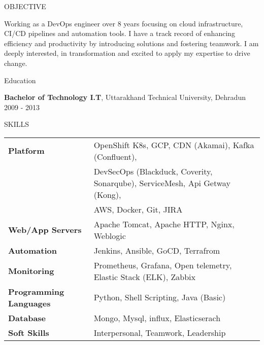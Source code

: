 \documentclass{resume} %
\begin{document}

\begin{rSection}{OBJECTIVE}

{Working as a DevOps engineer over 8 years focusing on cloud infrastructure, CI/CD pipelines and automation tools. I have a track record of enhancing efficiency and productivity by introducing solutions and fostering teamwork. I am deeply interested, in transformation and excited to apply my expertise to drive change.}


\end{rSection}

\begin{rSection}{Education}


{\bf Bachelor of Technology I.T}, Uttarakhand Technical University, Dehradun \hfill {2009 - 2013}


\end{rSection}

\begin{rSection}{SKILLS}

\begin{tabular}{ @{} >{\bfseries}l @{\hspace{4ex}} l }
Platform  & OpenShift K8s, GCP, CDN (Akamai), Kafka (Confluent),\\ &  DevSecOps (Blackduck, Coverity, Sonarqube), ServiceMesh, Api Getway (Kong),\\ & AWS, Docker, Git, JIRA\\
Web/App Servers & Apache Tomcat, Apache HTTP, Nginx, Weblogic\\
Automation & Jenkins, Ansible, GoCD, Terrafrom\\
Monitoring & Prometheus, Grafana, Open telemetry, Elastic Stack (ELK), Zabbix\\
Programming Languages &  Python, Shell Scripting, Java (Basic)\\
Database &  Mongo, Mysql, influx, Elasticserach\\
Soft Skills & Interpersonal, Teamwork, Leadership\\
\end{tabular}\\
\end{rSection}
\end{document}
